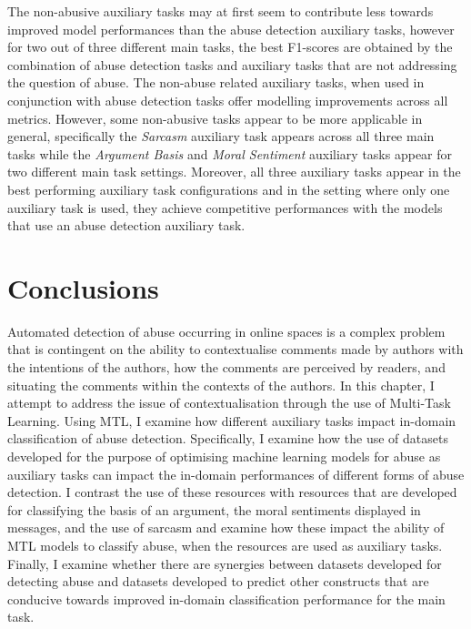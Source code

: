 The non-abusive auxiliary tasks may at first seem to contribute less towards improved model performances than the abuse detection auxiliary tasks, however for two out of three different main tasks, the best F1-scores are obtained by the combination of abuse detection tasks and auxiliary tasks that are not addressing the question of abuse.
The non-abuse related auxiliary tasks, when used in conjunction with abuse detection tasks offer modelling improvements across all metrics.
However, some non-abusive tasks appear to be more applicable in general, specifically the \textit{Sarcasm} auxiliary task appears across all three main tasks while the \textit{Argument Basis} and \textit{Moral Sentiment} auxiliary tasks appear for two different main task settings.
Moreover, all three auxiliary tasks appear in the best performing auxiliary task configurations and in the setting where only one auxiliary task is used, they achieve competitive performances with the models that use an abuse detection auxiliary task.

\section{Conclusions}

Automated detection of abuse occurring in online spaces is a complex problem that is contingent on the ability to contextualise comments made by authors with the intentions of the authors, how the comments are perceived by readers, and situating the comments within the contexts of the authors.
In this chapter, I attempt to address the issue of contextualisation through the use of Multi-Task Learning.
Using MTL, I examine how different auxiliary tasks impact in-domain classification of abuse detection.
Specifically, I examine how the use of datasets developed for the purpose of optimising machine learning models for abuse as auxiliary tasks can impact the in-domain performances of different forms of abuse detection.
I contrast the use of these resources with resources that are developed for classifying the basis of an argument, the moral sentiments displayed in messages, and the use of sarcasm and examine how these impact the ability of MTL models to classify abuse, when the resources are used as auxiliary tasks.
Finally, I examine whether there are synergies between datasets developed for detecting abuse and datasets developed to predict other constructs that are conducive towards improved in-domain classification performance for the main task.

